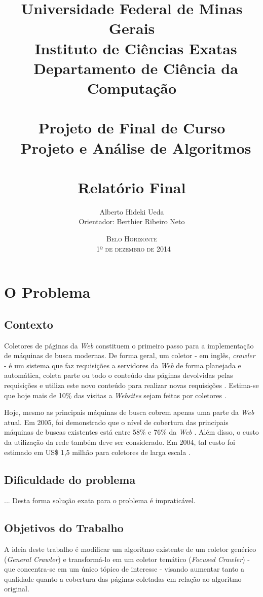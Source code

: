 \documentclass[a4paper,12pt,titlepage]{article}
\title{\large
Universidade Federal de Minas Gerais \\ \
Instituto de Ciências Exatas \\ \ 
Departamento de Ciência da Computação \\ \
\\[1cm]
Projeto de Final de Curso\\ \
Projeto e Análise de Algoritmos\\ \
\\[1cm]
\textbf{\Large Relatório Final }
\\[1cm]
}
\author{\large Alberto Hideki Ueda \\[0.5cm] 
	Orientador: Berthier Ribeiro Neto 
\\[3cm] }
\date{\textsc{Belo Horizonte\\ \
1º de dezembro de 2014}}
\begin{document}
\maketitle

\pagebreak
\tableofcontents
\pagebreak

\section {O Problema}

\subsection{Contexto}

Coletores de páginas da \textit{Web} constituem o primeiro passo para a implementação de máquinas de busca modernas. De forma geral, um coletor - em inglês, \textit{crawler} - é um sistema que faz requisições a servidores da \textit{Web} de forma planejada e automática, coleta parte ou todo o conteúdo das páginas devolvidas pelas requisições e utiliza este novo conteúdo para realizar novas requisições \cite{b}. Estima-se que hoje mais de 10\% das visitas a \textit{Websites} sejam feitas por coletores \cite{nielsen}.

Hoje, mesmo as principais máquinas de busca cobrem apenas uma parte da \textit{Web} atual. Em 2005, foi demonstrado que o nível de cobertura das principais máquinas de buscas existentes está entre 58\% e 76\% da \textit{Web} \cite{gulli}. Além disso, o custo da utilização da rede também deve ser considerado. Em 2004, tal custo foi estimado em US\$ 1,5 milhão para coletores de larga escala \cite{craswell}. 

\subsection{Dificuldade do problema}

... Desta forma solução exata para o problema é impraticável.

\subsection{Objetivos do Trabalho}

A ideia deste trabalho é modificar um algoritmo existente de um coletor genérico (\textit{General Crawler}) e transformá-lo em um coletor temático (\textit{Focused Crawler}) - que concentra-se em um único tópico de interesse - visando aumentar tanto a qualidade quanto a cobertura das páginas coletadas em relação ao algoritmo original.
\end{document}
